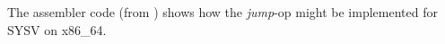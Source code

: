 
The assembler code (from \boostcontext) shows how the \textit{jump}-op might
be implemented for SYSV on x86\_64.
